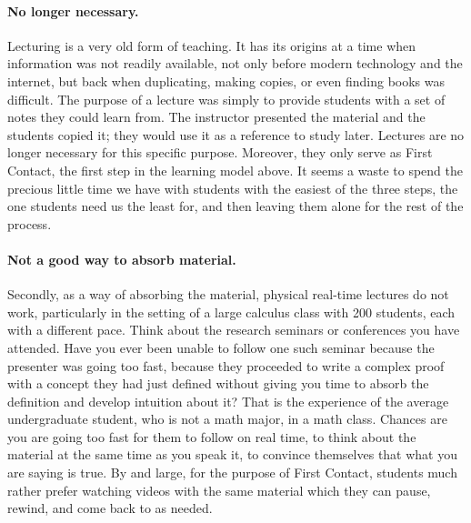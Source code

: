 \documentclass[11pt]{article}
\begin{document}
\paragraph{No longer necessary.} Lecturing is a very old form of teaching.  It has its origins at a time when information was not readily available, not only before modern technology and the internet, but back when duplicating, making copies, or even finding books was difficult.  The purpose of a lecture was simply to provide students with a set of notes they could learn from.    The instructor presented the material and the students copied it; they would use it as a reference to study later. Lectures are no longer necessary for this specific purpose.   Moreover, they only serve as First Contact, the first step in the learning model above.  It seems a waste to spend the precious little time we have with students with the easiest of the three steps, the one students need us the least for, and then leaving them alone for the rest of the process.

\paragraph{Not a good way to absorb material.} Secondly, as a way of absorbing the material, physical real-time lectures do not work, particularly in the setting of a large calculus class with 200 students, each with a different pace.  Think about the research seminars or conferences you have attended.  Have you ever been unable to follow one such seminar because the presenter was going too fast, because they proceeded to write a complex proof with a concept they had just defined without giving you time to absorb the definition and develop intuition about it?  That is the experience of the average undergraduate student, who is not a math major, in a math class.  Chances are you are going too fast for them to follow on real time, to think about the material at the same time as you speak it, to convince themselves that what you are saying is true.   By and large, for the purpose of First Contact, students much rather prefer watching videos with the same material which they can pause, rewind, and come back to as needed.
\end{document}
